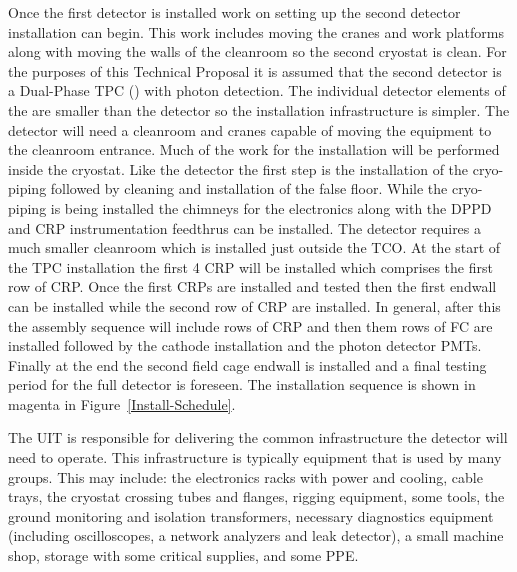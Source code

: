 Once the first detector is installed work on setting up the second
detector installation can begin. This work includes moving the cranes
and work platforms along with moving the walls of the cleanroom so the
second cryostat is clean. For the purposes of this Technical Proposal
it is assumed that the second detector is a Dual-Phase TPC
() with photon detection. The individual detector elements
of the  are smaller than the  detector so the
installation infrastructure is simpler. The  detector will
need a cleanroom and cranes capable of moving the equipment to the
cleanroom entrance. Much of the work for the  installation
will be performed inside the cryostat. Like the  detector
the first step is the installation of the cryo-piping followed by
cleaning and installation of the false floor. While the cryo-piping is
being installed the  chimneys for the electronics along with
the DPPD and CRP instrumentation feedthrus can be installed. The
 detector requires a much smaller cleanroom which is
installed just outside the TCO. At the start of the TPC installation
the first \num{4} CRP will be installed which comprises the first row of
CRP. Once the first CRPs are installed and tested then the first
endwall can be installed while the second row of CRP are installed. In
general, after this the assembly sequence will include rows of CRP and
then them rows of FC are installed followed by the cathode
installation and the photon detector PMTs. Finally at the end the
second field cage endwall is installed and a final testing period for
the full detector is foreseen. The  installation sequence is
shown in magenta in Figure~\ref{Install-Schedule}.

The UIT is responsible for delivering the common infrastructure
the detector will need to operate. This infrastructure is typically
equipment that is used by many groups. This may include: the
electronics racks with power and cooling, cable trays, the cryostat
crossing tubes and flanges, rigging equipment, some tools, the ground
monitoring and isolation transformers, necessary diagnostics equipment
(including oscilloscopes, a network analyzers and leak detector), a
small machine shop, storage with some critical supplies, and some PPE.

